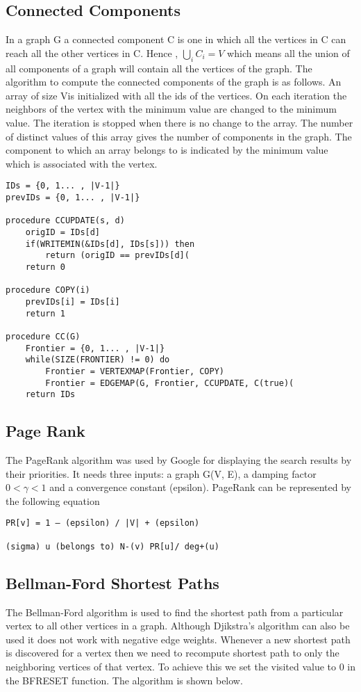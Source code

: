 \documentclass[a4paper,10pt,twoside]{article}
\begin{document}
\subsection{Connected Components}
In a graph G a connected component C is one in which all the vertices in C can reach all the other vertices in C. Hence , 
$ \bigcup _{i} C _{i} = V $ 
which means all the union of all components of a graph will contain all the vertices of the graph.
	The algorithm to compute the connected components of the graph is as follows. An array of size \textbar V\textbar is initialized with all the ids of the vertices. On each iteration the neighbors of the vertex with the minimum value are changed to the minimum value. The iteration is stopped when there is no change to the array. The number of distinct values of this array gives the number of components in the graph. The component to which an array belongs to is indicated by the minimum value which is associated with the vertex.

\begin{lstlisting}
IDs = {0, 1... , |V-1|}
prevIDs = {0, 1... , |V-1|}

procedure CCUPDATE(s, d)
	origID = IDs[d]
	if(WRITEMIN(&IDs[d], IDs[s])) then
		return (origID == prevIDs[d](
	return 0

procedure COPY(i)
	prevIDs[i] = IDs[i]
	return 1

procedure CC(G)
	Frontier = {0, 1... , |V-1|}
	while(SIZE(FRONTIER) != 0) do
		Frontier = VERTEXMAP(Frontier, COPY)
		Frontier = EDGEMAP(G, Frontier, CCUPDATE, C(true)(
	return IDs
\end{lstlisting}


\subsection{Page Rank}
The PageRank algorithm was used by Google for displaying the search results by their priorities. It needs three inputs: a graph G(V, E), a damping factor $ 0 < \gamma < 1 $ and a convergence constant (epsilon). PageRank can be represented by the following equation

\begin{lstlisting}
PR[v] = 1 – (epsilon) / |V| + (epsilon)

(sigma) u (belongs to) N-(v) PR[u]/ deg+(u)
\end{lstlisting}


\subsection{Bellman-Ford Shortest Paths}
The Bellman-Ford algorithm is used to find the shortest path from a particular vertex to all other vertices in a graph. Although Djikstra's algorithm can also be used it does not work with negative edge weights. Whenever a new shortest path is discovered for a vertex then we need to recompute shortest path to only the neighboring vertices of that vertex. To achieve this we set the visited value to 0 in the BFRESET function. The algorithm is shown below.
\end{document}
